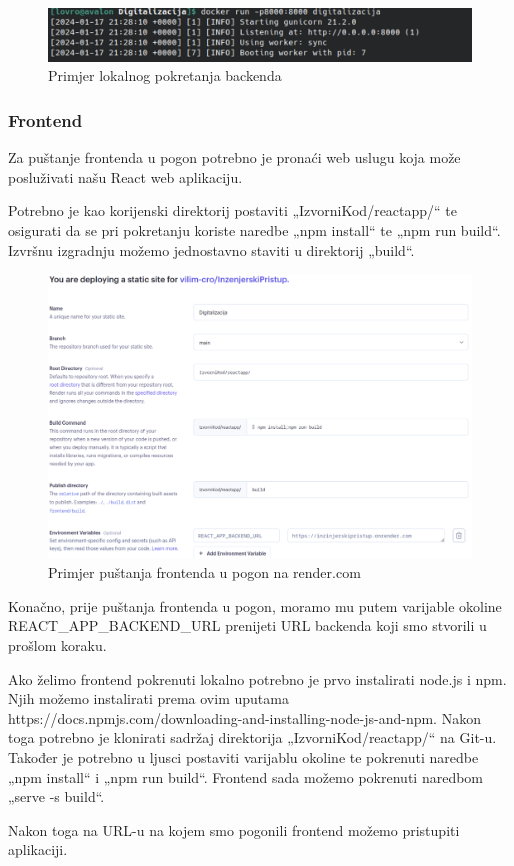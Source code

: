 			\begin{figure}[H]
				\includegraphics[width=\textwidth]{slike/runBackendLocal.png}
				\caption{Primjer lokalnog pokretanja backenda}
				\label{fig:lokalno-pokretanje-backenda}
			\end{figure}


			\subsubsection{Frontend}

			Za puštanje frontenda u pogon potrebno je pronaći web uslugu koja može posluživati našu React web aplikaciju.

			Potrebno je kao korijenski direktorij postaviti „IzvorniKod/reactapp/“ te osigurati da se pri pokretanju koriste
			naredbe „npm install“ te „npm run build“. Izvršnu izgradnju možemo jednostavno staviti u direktorij „build“. 

			\begin{figure}[H]
				\includegraphics[width=\textwidth]{slike/deployingFrontend.png}
				\caption{Primjer puštanja frontenda u pogon na render.com}
				\label{fig:lokalno-pokretanje-backenda}
			\end{figure}

			Konačno, prije puštanja frontenda u pogon, moramo mu putem varijable okoline REACT\_APP\_BACKEND\_URL prenijeti URL
			backenda koji smo stvorili u prošlom koraku.

			Ako želimo frontend pokrenuti lokalno potrebno je prvo instalirati node.js i npm. Njih možemo instalirati prema ovim
			uputama https://docs.npmjs.com/downloading-and-installing-node-js-and-npm.
			Nakon toga potrebno je klonirati sadržaj direktorija „IzvorniKod/reactapp/“ na Git-u. Također je potrebno u ljusci
			postaviti varijablu okoline te pokrenuti naredbe „npm install“ i „npm run build“. Frontend sada možemo pokrenuti
			naredbom „serve -s build“. 

			Nakon toga na URL-u na kojem smo pogonili frontend možemo pristupiti aplikaciji.
			
			\eject 